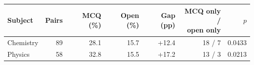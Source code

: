 \begin{tabular}{@{}lrrrrrr@{}}
\toprule
Subject & Pairs & MCQ (\%) & Open (\%) & Gap (pp) & \makecell{MCQ only /\\open only} & $p$ \\
\midrule
Chemistry & 89 & 28.1 & 15.7 & +12.4 & 18 / 7 & 0.0433 \\
Physics & 58 & 32.8 & 15.5 & +17.2 & 13 / 3 & 0.0213 \\
\bottomrule
\end{tabular}
